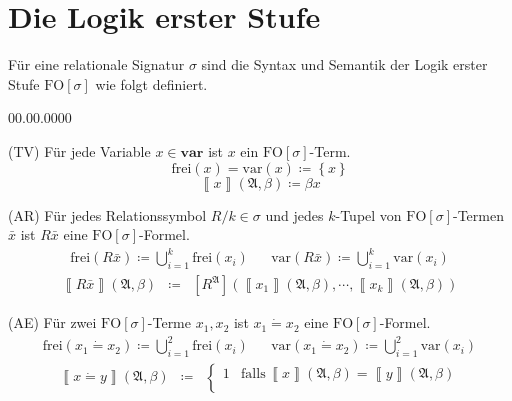 \section{Die Logik erster Stufe}
\begin{defn}
\label{def:fo}Für eine relationale Signatur $\sigma$ sind die Syntax
und Semantik der Logik erster Stufe $\mathrm{FO}\left[\sigma\right]$
wie folgt definiert.
\end{defn}
\begin{labeling}{00.00.0000}
\item [{(TV)}] Für jede Variable $x\in\mathbf{var}$ ist $x$ ein $\mathrm{FO}\left[\sigma\right]$-Term.
\[
\mathrm{frei}\left(x\right)=\mathrm{var}\left(x\right)\coloneqq\left\{ x\right\} 
\]
\[
\left\llbracket x\right\rrbracket \left(\mathfrak{A},\beta\right)\coloneqq\beta x
\]
\item [{(AR)}] Für jedes Relationssymbol $R/k\in\sigma$ und jedes $k$-Tupel
von $\mathrm{FO}\left[\sigma\right]$-Termen $\bar{x}$ ist $R\bar{x}$
eine $\mathrm{FO}\left[\sigma\right]$-Formel.
\begin{eqnarray*}
\mathrm{frei}\left(R\bar{x}\right)\coloneqq\bigcup_{i=1}^{k}\mathrm{frei}\left(x_{i}\right) &  & \mathrm{var}\left(R\bar{x}\right)\coloneqq\bigcup_{i=1}^{k}\mathrm{var}\left(x_{i}\right)
\end{eqnarray*}
\begin{eqnarray*}
\left\llbracket R\bar{x}\right\rrbracket \left(\mathfrak{A},\beta\right) & \coloneqq & \left[R^{\mathfrak{A}}\right]\left(\left\llbracket x_{1}\right\rrbracket \left(\mathfrak{A},\beta\right),\cdots,\left\llbracket x_{k}\right\rrbracket \left(\mathfrak{A},\beta\right)\right)
\end{eqnarray*}
\item [{(AE)}] Für zwei $\mathrm{FO}\left[\sigma\right]$-Terme $x_{1},x_{2}$
ist $x_{1}\dot{=}x_{2}$ eine $\mathrm{FO}\left[\sigma\right]$-Formel.
\begin{eqnarray*}
\mathrm{frei}\left(x_{1}\dot{=}x_{2}\right)\coloneqq\bigcup_{i=1}^{2}\mathrm{frei}\left(x_{i}\right) &  & \mathrm{var}\left(x_{1}\dot{=}x_{2}\right)\coloneqq\bigcup_{i=1}^{2}\mathrm{var}\left(x_{i}\right)
\end{eqnarray*}
\begin{eqnarray*}
\left\llbracket x\dot{=}y\right\rrbracket \left(\mathfrak{A},\beta\right) & \coloneqq & \begin{cases}
1 & \mathrm{falls}\,\left\llbracket x\right\rrbracket \left(\mathfrak{A},\beta\right)=\left\llbracket y\right\rrbracket \left(\mathfrak{A},\beta\right)\\

\end{cases}
\end{eqnarray*}
\end{labeling}
